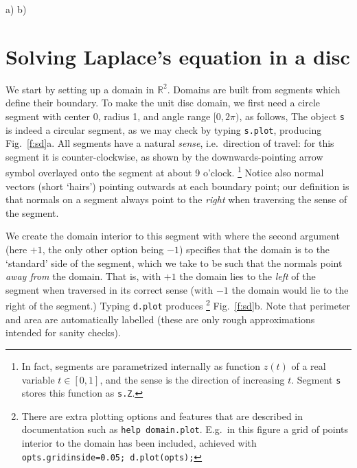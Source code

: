 \bfi %
a)
b)
\efi

\section{Solving Laplace's equation in a disc}
\label{s:lap}

We start by setting up a domain in $\mathbb{R}^2$.
Domains are built from segments which define their boundary.
To make the unit disc domain,
we first need a circle segment with center
0, radius 1, and angle range
$[0,2\pi)$, as follows,
The object {\tt s} is indeed a circular segment, as we may check by
typing {\tt s.plot}, producing Fig.~\ref{f:sd}a.
All segments have a natural {\em sense}, i.e.\ direction of travel:
for this segment it is counter-clockwise, as shown by the
downwards-pointing
arrow symbol overlayed onto the segment at about 9 o'clock.%
  \footnote{In fact, segments are parametrized internally as function $z(t)$
    of a real variable $t\in[0,1]$, and the sense is the direction of
    increasing $t$. Segment {\tt s} stores this function as {\tt s.Z}.}
Notice also normal vectors (short `hairs') pointing outwards
at each boundary point; our definition is that
normals on a segment always point to the {\em right} when traversing the
sense of the segment.

We create the domain interior to this segment with
where the second argument (here $+1$, the only other option being $-1$)
specifies that the domain is to the `standard' side of the segment, which
we take to be such that the normals point {\em away from} the domain.
That is, with $+1$ the domain lies to the {\em left} of the segment
when traversed in its correct sense (with $-1$ the domain
would lie to the right of the segment.)
Typing {\tt d.plot} produces%
  \footnote{There are extra plotting options and features that
    are described in documentation such as {\tt help domain.plot}.
    E.g.\ in this figure a grid of points interior to the domain has been
    included, achieved with {\tt opts.gridinside=0.05; d.plot(opts);}
  }
Fig.~\ref{f:sd}b.
Note that perimeter and area are automatically
labelled (these are only rough approximations intended for sanity checks).

